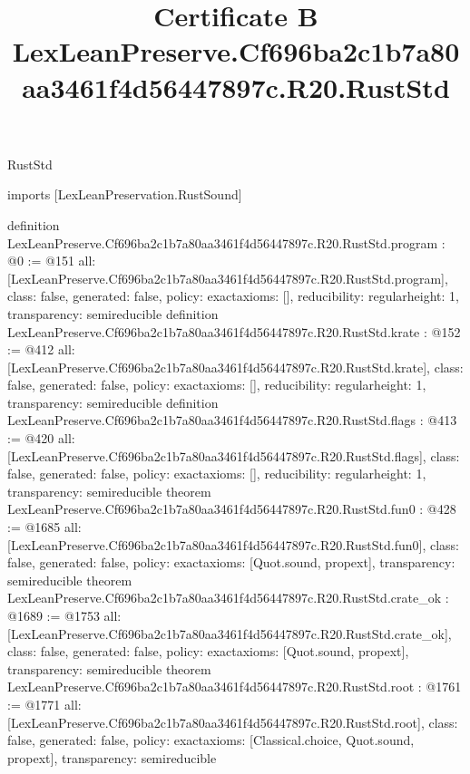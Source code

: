 \begin{lexlean}{RustStd}
\title{Certificate B LexLeanPreserve.Cf696ba2c1b7a80aa3461f4d56447897c.R20.RustStd}
\begin{coremodule}
imports [LexLeanPreservation.RustSound]

definition LexLeanPreserve.Cf696ba2c1b7a80aa3461f4d56447897c.R20.RustStd.program : @0 := @151 {
  all: [LexLeanPreserve.Cf696ba2c1b7a80aa3461f4d56447897c.R20.RustStd.program],
  class: false,
  generated: false,
  policy: exact{axioms: []},
  reducibility: regular{height: 1},
  transparency: semireducible
}
definition LexLeanPreserve.Cf696ba2c1b7a80aa3461f4d56447897c.R20.RustStd.krate : @152 := @412 {
  all: [LexLeanPreserve.Cf696ba2c1b7a80aa3461f4d56447897c.R20.RustStd.krate],
  class: false,
  generated: false,
  policy: exact{axioms: []},
  reducibility: regular{height: 1},
  transparency: semireducible
}
definition LexLeanPreserve.Cf696ba2c1b7a80aa3461f4d56447897c.R20.RustStd.flags : @413 := @420 {
  all: [LexLeanPreserve.Cf696ba2c1b7a80aa3461f4d56447897c.R20.RustStd.flags],
  class: false,
  generated: false,
  policy: exact{axioms: []},
  reducibility: regular{height: 1},
  transparency: semireducible
}
theorem LexLeanPreserve.Cf696ba2c1b7a80aa3461f4d56447897c.R20.RustStd.fun0 : @428 := @1685 {
  all: [LexLeanPreserve.Cf696ba2c1b7a80aa3461f4d56447897c.R20.RustStd.fun0],
  class: false,
  generated: false,
  policy: exact{axioms: [Quot.sound, propext]},
  transparency: semireducible
}
theorem LexLeanPreserve.Cf696ba2c1b7a80aa3461f4d56447897c.R20.RustStd.crate_ok : @1689 := @1753 {
  all: [LexLeanPreserve.Cf696ba2c1b7a80aa3461f4d56447897c.R20.RustStd.crate_ok],
  class: false,
  generated: false,
  policy: exact{axioms: [Quot.sound, propext]},
  transparency: semireducible
}
theorem LexLeanPreserve.Cf696ba2c1b7a80aa3461f4d56447897c.R20.RustStd.root : @1761 := @1771 {
  all: [LexLeanPreserve.Cf696ba2c1b7a80aa3461f4d56447897c.R20.RustStd.root],
  class: false,
  generated: false,
  policy: exact{axioms: [Classical.choice, Quot.sound, propext]},
  transparency: semireducible
}


\end{coremodule}
\end{lexlean}
